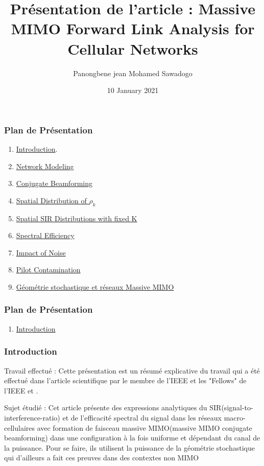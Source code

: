 \documentclass[pdf]{beamer}
\title{Présentation de l'article : Massive MIMO Forward Link Analysis for Cellular Networks}
\author{Panongbene jean Mohamed Sawadogo}
\institute{Ecole Polytechnique - 3rd year of Ecole Polytechnique}
\date{10 January 2021}
\begin{document}
\frame{\titlepage}
\begin{frame}
\frametitle{Plan de Présentation }
\begin{enumerate}
	\item \hyperlink{Introduction}{Introduction}.
	\item \hyperlink{networkModeling}{Network Modeling}
	\item \hyperlink{conjugateBeamforming}{Conjugate Beamforming} 
	\item \hyperlink{spatialDistribution}{Spatial Distribution of $\rho_k$}
	\item \hyperlink{spatialsir}{Spatial SIR Distributions with fixed K}
	\item \hyperlink{spectralEfficiency}{Spectral Efficiency}
	\item \hyperlink{impactOfNoise}{Impact of Noise}
	\item \hyperlink{piloteContamination}{Pilot Contamination}
	\item \hyperlink{autredoc}{Géométrie stochastique et réseaux Massive MIMO}
\end{enumerate}
\end{frame}

\begin{frame}
\frametitle{Plan de Présentation }
\begin{enumerate}
	\item \hyperlink{Introduction}{Introduction}
\end{enumerate}
\end{frame}

\begin{frame}[label=Introduction]
\frametitle{Introduction}
\transblindshorizontal
\begin{exampleblock}{Travail effectué :}
\justify
Cette présentation est un résumé explicative du travail qui a été effectué dans l'article scientifique \href{https://arxiv.org/pdf/1811.00110.pdf}{\color{blue}{Massive MIMO Forward Link Analysis
for Cellular Networks}} par le membre de l'IEEE {\color{blue}{Geordie Georg}} et les "Fellows" de l'IEEE {\color{blue}{Angel Lozano}} et {\color{blue}{Martin Haenggi}}.
\end{exampleblock}\pause
\begin{exampleblock}{Sujet étudié :}
\justify
Cet article présente des expressions analytiques du SIR(signal-to-interference-ratio) et de l'efficacité spectral du signal dans les réseaux macro-cellulaires avec formation de faisceau massive MIMO(massive MIMO conjugate beamforming) dans une configuration à la fois uniforme et dépendant du canal de la puissance.
Pour se faire, ils utilisent la puissance de la géométrie stochastique qui d’ailleurs a fait ces preuves dans des contextes non MIMO
\end{exampleblock}
\end{frame}
\end{document}
